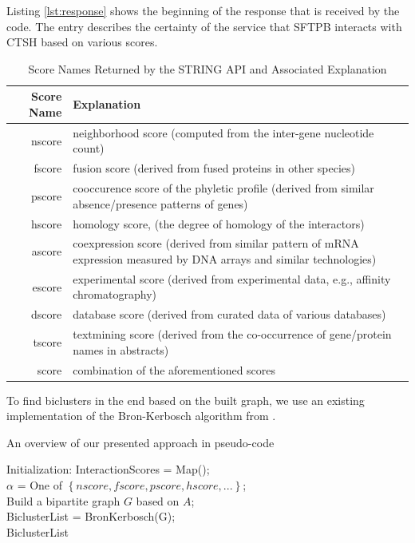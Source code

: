 \documentclass[10pt, conference, compsocconf]{IEEEtran}
\begin{document}
Listing \ref{lst:response} shows the beginning of the response that is received by the code.
The entry describes the certainty of the service that SFTPB interacts with CTSH based on various scores.
\begin{table}[]
    \centering
    \begin{tabularx}{\columnwidth}{r|X}
        Score Name & Explanation \\ \hline
        nscore	& neighborhood score (computed from the inter-gene nucleotide count) \\
        fscore& fusion score (derived from fused proteins in other species) \\
        pscore & cooccurence score of the phyletic profile (derived from similar absence/presence patterns of genes) \\
        hscore & homology score,   (the degree of homology of the interactors) \\
        ascore & coexpression score (derived from similar pattern of mRNA expression measured by DNA arrays and similar technologies) \\
        escore & experimental score (derived from experimental data, e.g., affinity chromatography) \\
        dscore & database score (derived from curated data of various databases) \\
        tscore & textmining score (derived from the co-occurrence of gene/protein names in abstracts) \\
        score & combination of the aforementioned scores \\
    \end{tabularx}
    \caption{Score Names Returned by the STRING API and Associated Explanation}
    \label{tab:scores}
\end{table}
To find biclusters in the end based on the built graph, we use an existing implementation of the Bron-Kerbosch algorithm from \cite{Github18}.
\begin{algorithm}[]
 \caption{An overview of our presented approach in pseudo-code}
 \label{algo:overview}
 Initialization: InteractionScores = Map();\\
 $\alpha$ = One of $\left\{nscore, fscore, pscore, hscore, ...\right\}$;\\
 Build a bipartite graph $G$ based on $A$;\\
 BiclusterList = BronKerbosch(G);\\
 \Return BiclusterList\\
 \hfill
\end{algorithm}
\end{document}
